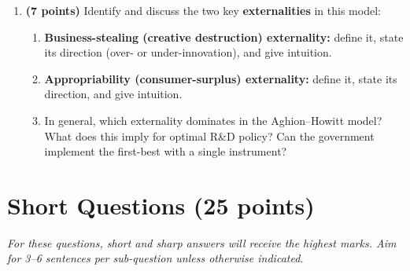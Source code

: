 \documentclass[a4paper,11pt]{article}
\begin{document}
\begin{enumerate}[label=\textbf{\arabic*.}, leftmargin=*, itemsep=6pt]
    \item \textbf{(7 points)} Identify and discuss the two key \textbf{externalities} in
    this model:
    \begin{enumerate}[label=(\alph*), itemsep=4pt]
        \item \textbf{Business-stealing (creative destruction) externality:} define it, state
        its direction (over- or under-innovation), and give intuition.
        \item \textbf{Appropriability (consumer-surplus) externality:} define it, state its
        direction, and give intuition.
        \item In general, which externality dominates in the Aghion--Howitt model?  What
        does this imply for optimal R\&D policy?  Can the government implement the
        first-best with a single instrument?
    \end{enumerate}

\end{enumerate}

\clearpage

\section{Short Questions \hfill (25 points)}

\noindent\textit{For these questions, short and sharp answers will receive the highest marks.
Aim for 3--6 sentences per sub-question unless otherwise indicated.}

\vspace{8pt}
\end{document}
